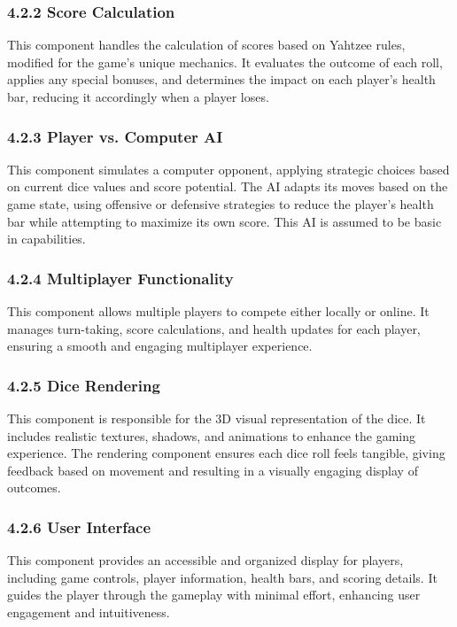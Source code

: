 \documentclass{article}
\begin{document}
\subsubsection*{4.2.2 Score Calculation}
This component handles the calculation of scores based on Yahtzee rules, modified for the game's unique mechanics. It evaluates the outcome of each roll, applies any special bonuses, and determines the impact on each player's health bar, reducing it accordingly when a player loses.

\subsubsection*{4.2.3 Player vs. Computer AI}
This component simulates a computer opponent, applying strategic choices based on current dice values and score potential. The AI adapts its moves based on the game state, using offensive or defensive strategies to reduce the player's health bar while attempting to maximize its own score. This AI is assumed to be basic in capabilities.

\subsubsection*{4.2.4 Multiplayer Functionality}
This component allows multiple players to compete either locally or online. It manages turn-taking, score calculations, and health updates for each player, ensuring a smooth and engaging multiplayer experience.

\subsubsection*{4.2.5 Dice Rendering}
This component is responsible for the 3D visual representation of the dice. It includes realistic textures, shadows, and animations to enhance the gaming experience. The rendering component ensures each dice roll feels tangible, giving feedback based on movement and resulting in a visually engaging display of outcomes.

\subsubsection*{4.2.6 User Interface}
This component provides an accessible and organized display for players, including game controls, player information, health bars, and scoring details. It guides the player through the gameplay with minimal effort, enhancing user engagement and intuitiveness.
\end{document}
